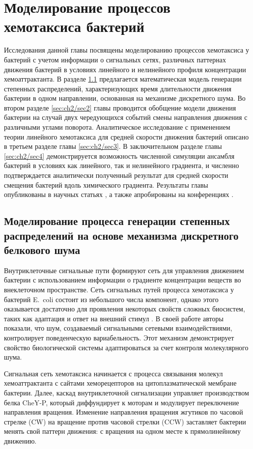 \chapter{Моделирование процессов хемотаксиса бактерий}\label{ch:ch2}

Исследования данной главы посвящены моделированию процессов хемотаксиса у бактерий с учетом информации о сигнальных сетях, различных паттернах движения бактерий в условиях линейного и нелинейного профиля концентрации хемоаттрактанта. В разделе \cref{sec:ch2/sec1} предлагается математическая модель генерации степенных распределений, характеризующих время длительности движения бактерии в одном направлении, основанная на механизме дискретного шума. Во втором разделе \cref{sec:ch2/sec2} главы проводится обобщение модели движения бактерии на случай двух чередующихся событий смены направления движения с различными углами поворота. Аналитическое исследование с применением теории линейного хемотаксиса для средней скорости движения бактерий описано в третьем разделе главы \cref{sec:ch2/sec3}. В заключительном разделе главы \cref{sec:ch2/sec4} демонстрируется возможность численной симуляции ансамбля бактерий в условиях как линейного, так и нелинейного градиента, и численно подтверждается аналитически полученный результат для средней скорости смещения бактерий вдоль химического градиента. Результаты главы опубликованы в научных статьях \cite{bib1,bib2}, а также апробированы на конференциях \cite{confbib5,confbib6}.  

\section{Моделирование процесса генерации степенных распределений на основе механизма дискретного белкового шума}\label{sec:ch2/sec1}
Внутриклеточные сигнальные пути формируют сеть для управления движением бактерии с использованием информации о градиенте концентрации веществ во внеклеточном пространстве. Сеть сигнальных путей процесса хемотаксиса у бактерий E.~coli состоит из небольшого числа компонент, однако этого оказывается достаточно для проявления некоторых свойств сложных биосистем, таких как адаптация и ответ на внешний стимул \cite{korobkova_molecular_2004}. В своей работе авторы показали, что шум, создаваемый сигнальными сетевыми взаимодействиями, контролирует поведенческую вариабельность. Этот механизм демонстрирует свойство биологической системы адаптироваться за счет контроля молекулярного шума. 

Сигнальная сеть хемотаксиса начинается с процесса связывания молекул хемоаттрактанта с сайтами хеморецепторов на цитоплазматической мембране бактерии. Далее, каскад внутриклеточной сигнализации управляет производством белка CheY-P, который диффундирует к моторам и модулирует переключение направления вращения. Изменение направления вращения жгутиков по часовой стрелке (CW) на вращение против часовой стрелки (CCW) заставляет бактерии менять свой паттерн движения: с вращения на одном месте к прямолинейному движению.

